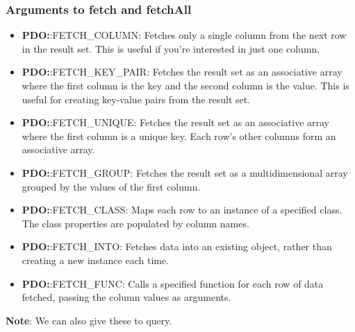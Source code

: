 \documentclass{report}
\begin{document}
    \bigbreak \noindent 
    \subsubsection{Arguments to fetch and fetchAll}
    \bigbreak \noindent 
    \begin{itemize}
        \item \textbf{PDO:}:FETCH\_COLUMN: Fetches only a single column from the next row in the result set. This is useful if you’re interested in just one column.
        \item \textbf{PDO:}:FETCH\_KEY\_PAIR: Fetches the result set as an associative array where the first column is the key and the second column is the value. This is useful for creating key-value pairs from the result set.
        \item \textbf{PDO:}:FETCH\_UNIQUE: Fetches the result set as an associative array where the first column is a unique key. Each row's other columns form an associative array.
        \item \textbf{PDO:}:FETCH\_GROUP: Fetches the result set as a multidimensional array grouped by the values of the first column.
        \item \textbf{PDO:}:FETCH\_CLASS: Maps each row to an instance of a specified class. The class properties are populated by column names.
        \item \textbf{PDO:}:FETCH\_INTO: Fetches data into an existing object, rather than creating a new instance each time.
        \item \textbf{PDO:}:FETCH\_FUNC: Calls a specified function for each row of data fetched, passing the column values as arguments.
    \end{itemize}
    \bigbreak \noindent 
    \textbf{Note}: We can also give these to query.



    \pagebreak 
\end{document}
